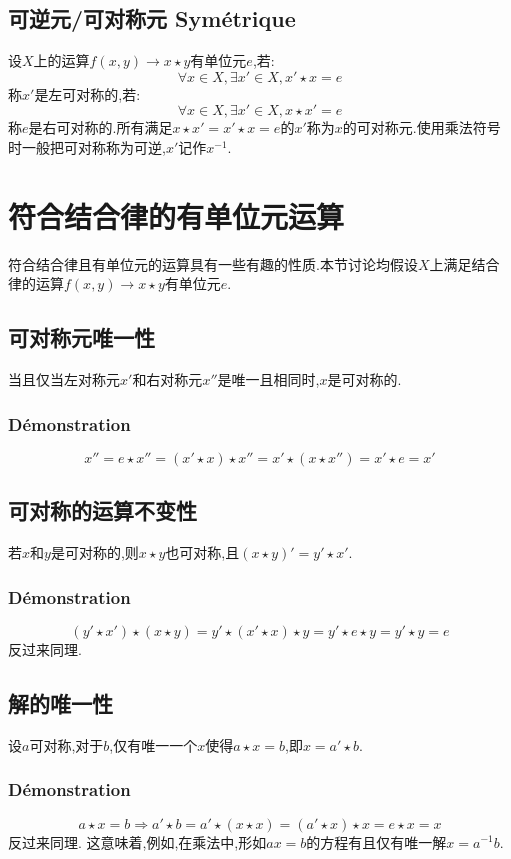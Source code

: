 \documentclass[12pt, a4paper, oneside]{ctexbook}
\begin{document}
  \subsection{可逆元/可对称元 Symétrique}
  设$X$上的运算$f(x,y)\rightarrow x\star y $有单位元$e$,若:
  $$
  \forall x\in X, \exists x'\in X,x'\star x=e
  $$
  称$x'$是左可对称的,若:
  $$
  \forall x\in X, \exists x'\in X,x\star x'=e
  $$
  称$e$是右可对称的.所有满足$x\star x'=x'\star x=e$的$x'$称为$x$的可对称元.使用乘法符号时一般把可对称称为可逆,$x'$记作$x^{-1}$.
  
  \section{符合结合律的有单位元运算}
  符合结合律且有单位元的运算具有一些有趣的性质.本节讨论均假设$X$上满足结合律的运算$f(x,y)\rightarrow x\star y $有单位元$e$.
  \subsection{可对称元唯一性}
  当且仅当左对称元$x'$和右对称元$x''$是唯一且相同时,$x$是可对称的.
  \subsubsection{Démonstration}
  $$
    x''=e\star x''=(x'\star x)\star x''=x'\star(x\star x'')=x'\star e=x'
  $$
  \subsection{可对称的运算不变性}
  若$x$和$y$是可对称的,则$x\star y$也可对称,且$(x\star y)'=y'\star x'$.
  \subsubsection{Démonstration}
  $$
    (y'\star x')\star(x\star y)=y'\star (x'\star x)\star y=y'\star e\star y=y'\star y=e
  $$反过来同理.
  \subsection{解的唯一性}
  设$a$可对称,对于$b$,仅有唯一一个$x$使得$a\star x=b$,即$x=a'\star b$.
  \subsubsection{Démonstration}
  $$
    a\star x=b\Rightarrow a'\star b=a'\star (x\star x)=(a'\star x)\star x=e\star x=x
  $$反过来同理.
  这意味着,例如,在乘法中,形如$ax=b$的方程有且仅有唯一解$x=a^{-1}b$.
\end{document}
